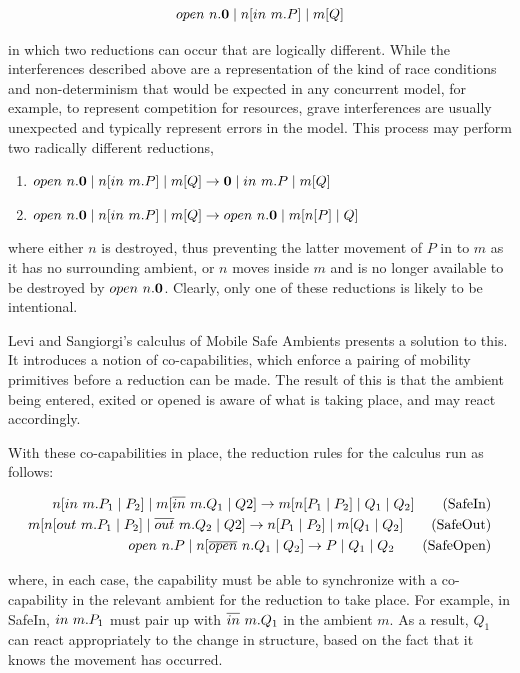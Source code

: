 \begin{equation}
open\ n.\textbf{0} \;|\; n[in\ m.P] \;|\; m[Q]
\end{equation}

\noindent in which two reductions can occur that are logically
different.  While the interferences described above are a
representation of the kind of race conditions and non-determinism that
would be expected in any concurrent model, for example, to represent
competition for resources, grave interferences are usually unexpected
and typically represent errors in the model.  This process may perform
two radically different reductions,

\begin{enumerate}
\item $open\ n.\textbf{0} \;|\; n[in\ m.P] \;|\; m[Q] \rightarrow \textbf{0} \;|\;
in\ m.P \;|\; m[Q]$
\item $open\ n.\textbf{0} \;|\; n[in\ m.P] \;|\; m[Q] \rightarrow
open\ n.\textbf{0} \;|\; m[n[P] \;|\; Q]$
\end{enumerate}

\noindent where either $n$ is destroyed, thus preventing the latter
movement of $P$ in to $m$ as it has no surrounding ambient, or $n$ moves
inside $m$ and is no longer available to be destroyed by
$open\ n.\textbf{0}$.  Clearly, only one of these reductions is likely to be
intentional.  

Levi and Sangiorgi's calculus of Mobile Safe Ambients
\cite{safeamb00,sangiorgi:mobsafeambients} presents a solution to
this.  It introduces a notion of co-capabilities, which enforce a
pairing of mobility primitives before a reduction can be made.  The
result of this is that the ambient being entered, exited or opened is
aware of what is taking place, and may react accordingly.

With these co-capabilities in place, the reduction rules for the
calculus run as follows:

\begin{align}
 n[in\ m.P_1 \;|\; P_2] \;|\; m[\overline{in}\ m.Q_1 \;|\; Q2]
\rightarrow
m[n[P_1 \;|\; P_2] \;|\; Q_1 \;|\; Q_2] \tag{SafeIn}\\
 m[n[out\ m.P_1 \;|\; P_2] \;|\; \overline{out}\ m.Q_2 \;|\; Q2]
\rightarrow
n[P_1 \;|\; P_2] \;|\; m[Q_1 \;|\; Q_2] \tag{SafeOut}\\
 open\ n.P \;|\; n[\overline{open}\ n.Q_1 \;|\; Q_2]
\rightarrow
P \;|\; Q_1 \;|\; Q_2 \tag{SafeOpen} 
\end{align}

\noindent where, in each case, the capability must be able to
synchronize with a co-capability in the relevant ambient for the
reduction to take place.  For example, in SafeIn, $in\ m.P_1$ must
pair up with $\overline{in}\ m.Q_1$ in the ambient $m$.  As a result, $Q_1$
can react appropriately to the change in structure, based on the fact
that it knows the movement has occurred.

